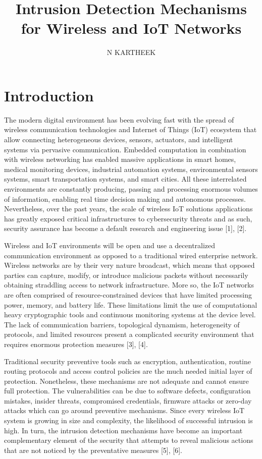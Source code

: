 \documentclass[12pt]{article}
\title{Intrusion Detection Mechanisms for Wireless
and IoT Networks}
\author{N KARTHEEK}
\date{}
\begin{document}
	\maketitle
	
	\section{Introduction}
	The modern digital environment has been evolving fast with the spread of wireless communication technologies and Internet of Things (IoT) ecosystem that allow connecting heterogeneous devices, sensors, actuators, and intelligent systems via pervasive communication. Embedded computation in combination with wireless networking has enabled massive applications in smart homes, medical monitoring devices, industrial automation systems, environmental sensors systems, smart transportation systems, and smart cities. All these interrelated environments are constantly producing, passing and processing enormous volumes of information, enabling real time decision making and autonomous processes. Nevertheless, over the past years, the scale of wireless IoT solutions applications has greatly exposed critical infrastructures to cybersecurity threats and as such, security assurance has become a default research and engineering issue [1], [2].



Wireless and IoT environments will be open and use a decentralized communication environment as opposed to a traditional wired enterprise network. Wireless networks are by their very nature broadcast, which means that opposed parties can capture, modify, or introduce malicious packets without necessarily obtaining straddling access to network infrastructure. More so, the IoT networks are often comprised of resource-constrained devices that have limited processing power, memory, and battery life. These limitations limit the use of computational heavy cryptographic tools and continuous monitoring systems at the device level. The lack of communication barriers, topological dynamism, heterogeneity of protocols, and limited resources present a complicated security environment that requires enormous protection measures [3], [4].



Traditional security preventive tools such as encryption, authentication, routine routing protocols and access control policies are the much needed initial layer of protection. Nonetheless, these mechanisms are not adequate and cannot ensure full protection. The vulnerabilities can be due to software defects, configuration mistakes, insider threats, compromised credentials, firmware attacks or zero-day attacks which can go around preventive mechanisms. Since every wireless IoT system is growing in size and complexity, the likelihood of successful intrusion is high. In turn, the intrusion detection mechanisms have become an important complementary element of the security that attempts to reveal malicious actions that are not noticed by the preventative measures [5], [6].
\end{document}
